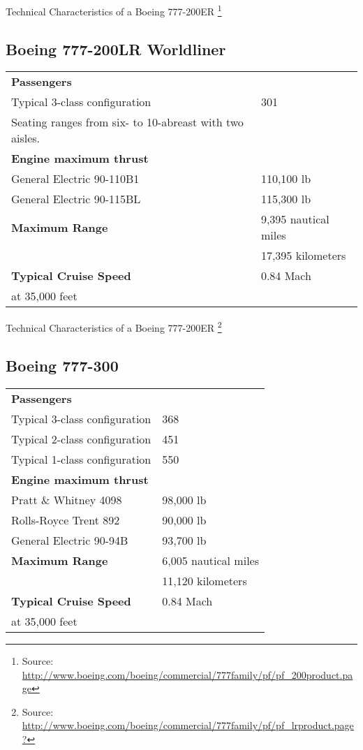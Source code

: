 Technical Characteristics of a Boeing 777-200ER \footnote{Source: \url{http://www.boeing.com/boeing/commercial/777family/pf/pf_200product.page}}

\subsection{Boeing 777-200LR Worldliner}
\begin{tabular}{l l}
\textbf{Passengers} & \\
Typical 3-class configuration & 301 \\
Seating ranges from six- to 10-abreast with two aisles. &\\
\hline
\textbf{Engine maximum thrust} & \\
General Electric 90-110B1 & 110,100 lb \\
General Electric 90-115BL & 115,300 lb\\
\hline
\textbf{Maximum Range} & 9,395 nautical miles \\
& 17,395 kilometers\\
\hline
\textbf {Typical Cruise Speed} & 0.84 Mach \\
at 35,000 feet & \\
\end{tabular}

Technical Characteristics of a Boeing 777-200ER \footnote{Source: \url{http://www.boeing.com/boeing/commercial/777family/pf/pf_lrproduct.page?}}

\subsection{Boeing 777-300}
\begin{tabular}{l l}
\textbf{Passengers} & \\
Typical 3-class configuration & 368 \\
Typical 2-class configuration & 451 \\
Typical 1-class configuration & 550 \\
\hline
\textbf{Engine maximum thrust} & \\
Pratt \& Whitney 4098 & 98,000 lb \\
Rolls-Royce Trent 892 & 90,000 lb \\
General Electric 90-94B & 93,700 lb \\
\hline
\textbf{Maximum Range} & 6,005 nautical miles \\
& 11,120 kilometers\\
\hline
\textbf {Typical Cruise Speed} & 0.84 Mach \\
at 35,000 feet & \\
\end{tabular}

